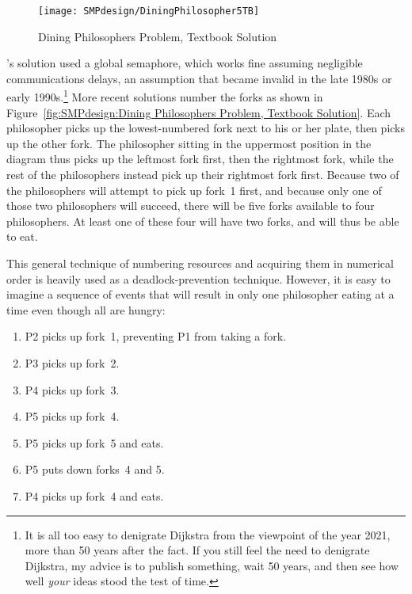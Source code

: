 \begin{figure}[tb]
\centering
\texttt{[image: SMPdesign/DiningPhilosopher5TB]}
\caption{Dining Philosophers Problem, Textbook Solution}
\end{figure}

's solution used a global semaphore,
which works fine assuming
negligible communications delays, an assumption that became invalid
in the late 1980s or early 1990s.\footnote{
	It is all too easy to denigrate Dijkstra from the viewpoint
	of the year 2021, more than 50 years after the fact.
	If you still feel the need to denigrate Dijkstra, my advice
	is to publish something, wait 50 years, and then see
	how well \emph{your} ideas stood the test of time.}
More recent solutions number the forks as shown in
Figure~\ref{fig:SMPdesign:Dining Philosophers Problem, Textbook Solution}.
Each philosopher picks up the lowest-numbered fork next to his or her
plate, then picks up the other fork.
The philosopher sitting in the uppermost position in the diagram thus
picks up the leftmost fork first, then the rightmost fork, while the
rest of the philosophers instead pick up their rightmost fork first.
Because two of the philosophers will attempt to pick up fork~1 first,
and because only one of those two philosophers will succeed,
there will be five forks available to four philosophers.
At least one of these four will have two forks, and will thus be able
to eat.

This general technique of numbering resources and acquiring them in
numerical order is heavily used as a deadlock-prevention technique.
However, it is easy to imagine a sequence of events that will result
in only one philosopher eating at a time even though all are hungry:

\begin{enumerate}
    \item P2 picks up fork~1, preventing P1 from taking a fork.
    \item P3 picks up fork~2.
    \item P4 picks up fork~3.
    \item P5 picks up fork~4.
    \item P5 picks up fork~5 and eats.
    \item P5 puts down forks~4 and 5.
    \item P4 picks up fork~4 and eats.
\end{enumerate}

